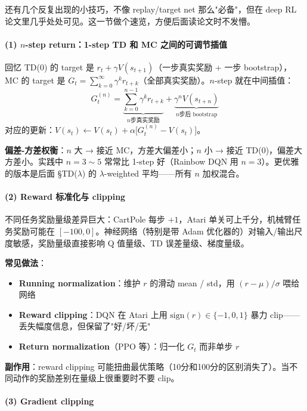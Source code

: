 \documentclass[11pt,a4paper]{article}
\theoremstyle{definition}
\begin{document}
\begin{plainwords}
还有几个反复出现的小技巧，不像 replay/target net 那么"必备"，但在 deep RL 论文里几乎处处可见。这一节做个速览，方便后面读论文时不发懵。
\end{plainwords}

\paragraph{(1) $n$-step return：1-step TD 和 MC 之间的可调节插值}

回忆 TD(0) 的 target 是 $r_t + \gamma V(s_{t+1})$（一步真实奖励 + 一步 bootstrap），MC 的 target 是 $G_t = \sum_{k=0}^\infty \gamma^k r_{t+k}$（全部真实奖励）。$n$-step 就在中间插值：
\[
G_t^{(n)} = \underbrace{\sum_{k=0}^{n-1} \gamma^k r_{t+k}}_{\text{$n$步真实奖励}} + \underbrace{\gamma^n V(s_{t+n})}_{\text{$n$步后 bootstrap}}
\]
对应的更新：$V(s_t) \leftarrow V(s_t) + \alpha\big[G_t^{(n)} - V(s_t)\big]$。

\textbf{偏差-方差权衡}：$n$ 大 → 接近 MC，方差大偏差小；$n$ 小 → 接近 TD(0)，偏差大方差小。实践中 $n = 3 \sim 5$ 常常比 1-step 好（Rainbow DQN 用 $n=3$）。更优雅的版本是后面 §TD($\lambda$) 的 $\lambda$-weighted 平均——所有 $n$ 加权混合。

\paragraph{(2) Reward 标准化与 clipping}

不同任务奖励量级差异巨大：CartPole 每步 $+1$，Atari 单关可上千分，机械臂任务奖励可能在 $[-100, 0]$。神经网络（特别是带 Adam 优化器的）对输入/输出尺度敏感，奖励量级直接影响 Q 值量级、TD 误差量级、梯度量级。

\textbf{常见做法}：
\begin{itemize}
\item \textbf{Running normalization}：维护 $r$ 的滑动 mean / std，用 $(r - \mu)/\sigma$ 喂给网络
\item \textbf{Reward clipping}：DQN 在 Atari 上用 $\text{sign}(r) \in \{-1, 0, 1\}$ 暴力 clip——丢失幅度信息，但保留了"好/坏/无"
\item \textbf{Return normalization}（PPO 等）：归一化 $G_t$ 而非单步 $r$
\end{itemize}

\textbf{副作用}：reward clipping 可能扭曲最优策略（10分和100分的区别消失了）。当不同动作的奖励差别在量级上很重要时不要 clip。

\paragraph{(3) Gradient clipping}
\end{document}
